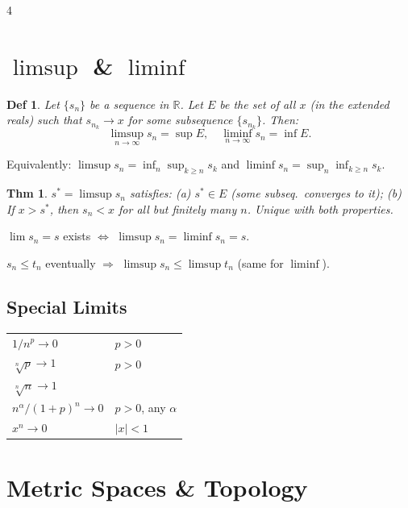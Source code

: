 \documentclass[9pt,landscape]{extarticle}
\newcommand{\R}{\mathbb{R}}
\theoremstyle{compact}
\newtheorem*{thm}{Thm}
\theoremstyle{defnstyle}
\newtheorem*{defn}{Def}
\begin{document}
\begin{multicols}{4}
\raggedcolumns

\section{$\limsup$ \& $\liminf$}

\begin{defn}
Let $\{s_n\}$ be a sequence in $\R$. Let $E$ be the set of all $x$ (in the extended reals) such that $s_{n_k} \to x$ for some subsequence $\{s_{n_k}\}$. Then:
$$\limsup_{n\to\infty} s_n = \sup E, \quad \liminf_{n\to\infty} s_n = \inf E.$$
\end{defn}

Equivalently: $\limsup s_n = \inf_{n} \sup_{k \geq n} s_k$ and $\liminf s_n = \sup_{n} \inf_{k \geq n} s_k$.

\begin{thm}
$s^* = \limsup s_n$ satisfies: (a) $s^* \in E$ (some subseq.\ converges to it); (b) If $x > s^*$, then $s_n < x$ for all but finitely many $n$. Unique with both properties.
\end{thm}

$\lim s_n = s$ exists $\Leftrightarrow$ $\limsup s_n = \liminf s_n = s$.

$s_n \leq t_n$ eventually $\Rightarrow$ $\limsup s_n \leq \limsup t_n$ (same for $\liminf$).

\subsection{Special Limits}
\begin{tabular}{@{}ll@{}}
$1/n^p \to 0$ & $p > 0$ \\
$\sqrt[n]{p} \to 1$ & $p > 0$ \\
$\sqrt[n]{n} \to 1$ &  \\
$n^\alpha/(1+p)^n \to 0$ & $p > 0$, any $\alpha$ \\
$x^n \to 0$ & $|x| < 1$ \\
\end{tabular}

\section{Metric Spaces \& Topology}


\end{multicols}
\end{document}
